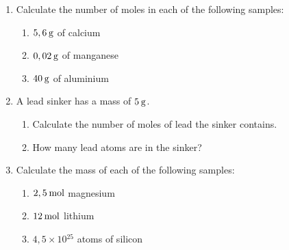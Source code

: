       \label{m38717*id278090}\begin{enumerate}[noitemsep, label=\textbf{\arabic*}. ] 
            \label{m38717*uid24}\item Calculate the number of moles in each of the following samples:
\label{m38717*id278106}\begin{enumerate}[noitemsep, label=\textbf{\alph*}. ] 
            \label{m38717*uid25}\item \begin{math}5,6\phantom{\rule{2pt}{0ex}}\mathrm{g}\end{math} of calcium
\label{m38717*uid26}\item \begin{math}0,02\phantom{\rule{2pt}{0ex}}\mathrm{g}\end{math} of manganese
\label{m38717*uid27}\item \begin{math}40\phantom{\rule{2pt}{0ex}}\mathrm{g}\end{math} of aluminium
\end{enumerate}
                \label{m38717*uid28}\item A lead sinker has a mass of \begin{math}5\phantom{\rule{2pt}{0ex}}\mathrm{g}\end{math}.
\label{m38717*id278159}\begin{enumerate}[noitemsep, label=\textbf{\alph*}. ] 
            \label{m38717*uid29}\item Calculate the number of moles of lead the sinker contains.
\label{m38717*uid30}\item How many lead atoms are in the sinker?
\end{enumerate}
                \label{m38717*uid31}\item Calculate the mass of each of the following samples:
\label{m38717*id278201}\begin{enumerate}[noitemsep, label=\textbf{\alph*}. ] 
            \label{m38717*uid32}\item \begin{math}2,5\phantom{\rule{2pt}{0ex}}\mathrm{mol}\end{math} magnesium
\label{m38717*uid33}\item \begin{math}12\phantom{\rule{2pt}{0ex}}\mathrm{mol}\end{math} lithium
\label{m38717*uid34}\item \begin{math}4,5\ensuremath{\times} 10{}^{25}\end{math} atoms of silicon
\end{enumerate}
                \end{enumerate}
        
